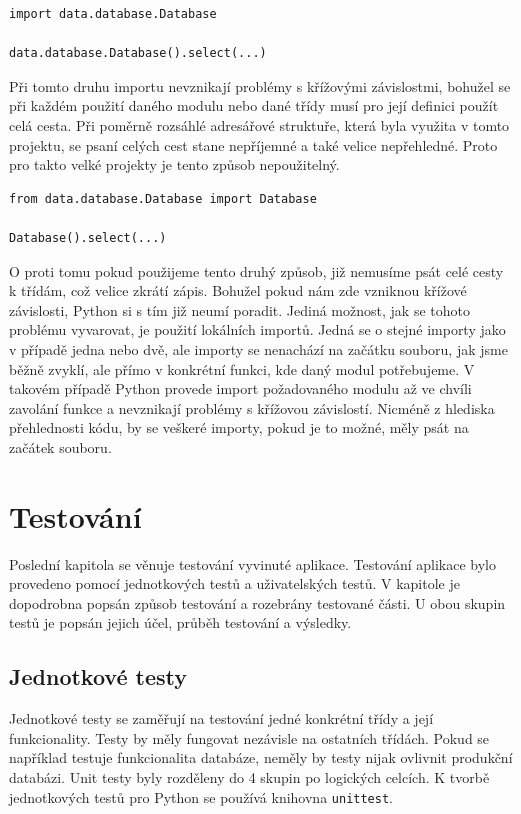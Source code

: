 \documentclass[thesis=B,czech]{resources/FITthesis}[2012/06/26]
\begin{document}
\begin{listing}[htbp]
\begin{verbatim}
import data.database.Database

data.database.Database().select(...)
\end{verbatim}
\end{listing}

Při tomto druhu importu nevznikají problémy s křížovými závislostmi, bohužel se při každém použití daného modulu nebo dané třídy musí pro její definici použít celá cesta. Při poměrně rozsáhlé adresářové struktuře, která byla využita v tomto projektu, se psaní celých cest stane nepříjemné a také velice nepřehledné. Proto pro takto velké projekty je tento způsob nepoužitelný.

\begin{listing}[htbp]
\begin{verbatim}
from data.database.Database import Database

Database().select(...)
\end{verbatim}
\end{listing}
O proti tomu pokud použijeme tento druhý způsob, již nemusíme psát celé cesty k třídám, což velice zkrátí zápis. Bohužel pokud nám zde vzniknou křížové závislosti, Python si s tím již neumí poradit. Jediná možnost, jak se tohoto problému vyvarovat, je použití lokálních importů. Jedná se o stejné importy jako v případě jedna nebo dvě, ale importy se nenachází na začátku souboru, jak jsme běžně zvyklí, ale přímo v konkrétní funkci, kde daný modul potřebujeme. V takovém případě Python provede import požadovaného modulu až ve chvíli zavolání funkce a nevznikají problémy s křížovou závislostí. Nicméně z hlediska přehlednosti kódu, by se veškeré importy, pokud je to možné, měly psát na začátek souboru. 



\chapter{Testování}
Poslední kapitola se věnuje testování vyvinuté aplikace. Testování aplikace bylo provedeno pomocí jednotkových testů a uživatelských testů. V kapitole je dopodrobna popsán způsob testování a rozebrány testované části. U obou skupin testů je popsán jejich účel, průběh testování a výsledky.
	\section{Jednotkové testy}
Jednotkové testy se zaměřují na testování jedné konkrétní třídy a její funkcionality. Testy by měly fungovat nezávisle na ostatních třídách. Pokud se například testuje funkcionalita databáze, neměly by testy nijak ovlivnit produkční databázi. Unit testy byly rozděleny do 4 skupin po logických celcích. K tvorbě jednotkových testů pro Python se používá knihovna \texttt{unittest}.
\end{document}
